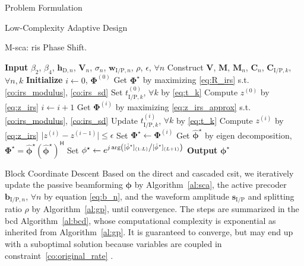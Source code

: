 \begin{section}{Problem Formulation}
\begin{subsection}{Low-Complexity Adaptive Design}
		\begin{algorithm}[!t]
			\caption{M-\gls{sca}: \gls{ris} Phase Shift.}
			\label{al:m_sca}
			\begin{algorithmic}[1]
				\State \textbf{Input} $\beta_2$, $\beta_4$, $\mathbf{h}_{\mathrm{D},n}$, $\mathbf{V}_{n}$, $\sigma_n$, $\mathbf{w}_{\mathrm{I/P},n}$, $\rho$, $\epsilon$, $\forall n$
				\State Construct $\mathbf{V}$, $\mathbf{M}$, $\mathbf{M}_n$, $\mathbf{C}_{n}$, $\mathbf{C}_{\mathrm{I/P},k}$, $\forall n,k$
				\State \textbf{Initialize} $i \gets 0$, $\mathbf{\Phi}^{(0)}$
					\State Get $\mathbf{\Phi}^{\star}$ by maximizing \eqref{eq:R_irs} s.t. \eqref{co:irs_modulus}, \eqref{co:irs_sd}
				\Else
					\State Set $t_{\mathrm{I/P},k}^{(0)}$, $\forall k$ by \eqref{eq:t_k}
					\State Compute $z^{(0)}$ by \eqref{eq:z_irs}
					\Repeat
						\State $i \gets i + 1$
							\State Get $\mathbf{\Phi}^{(i)}$ by maximizing \eqref{eq:z_irs_approx} s.t. \eqref{co:irs_modulus}, \eqref{co:irs_sd}
							\State Update $t_{\mathrm{I/P},k}^{(i)}$, $\forall k$ by \eqref{eq:t_k}
							\State Compute $z^{(i)}$ by \eqref{eq:z_irs}
					\Until $\lvert z^{(i)}-z^{(i-1)} \rvert \le \epsilon$
					\State Set $\mathbf{\Phi}^{\star} \gets \mathbf{\Phi}^{(i)}$
				\EndIf
				\State Get $\hat{\mathbf{\phi}}^\star$ by eigen decomposition, $\mathbf{\Phi}^{\star}=\hat{\mathbf{\phi}}^\star(\hat{\mathbf{\phi}}^\star)^\mathsf{H}$
				\State Set $\mathbf{\phi}^{\star} \gets e^{j \arg\left([\hat{\mathbf{\phi}}^\star]_{(1:L)} \middle/ [\hat{\mathbf{\phi}}^\star]_{(L+1)}\right)}$
				\State \textbf{Output} $\mathbf{\phi}^{\star}$
			\end{algorithmic}
		\end{algorithm}
	\end{subsection}


	\begin{subsection}{Block Coordinate Descent}
		Based on the direct and cascaded \gls{csit}, we iteratively update the passive beamforming $\mathbf{\phi}$ by Algorithm~\ref{al:sca}, the active precoder $\mathbf{b}_{\mathrm{I/P},n}$, $\forall n$ by equation \eqref{eq:b_n}, and the waveform amplitude $\mathbf{s}_{\mathrm{I/P}}$ and splitting ratio $\rho$ by Algorithm~\ref{al:gp}, until convergence. The steps are summarized in the \gls{bcd} Algorithm~\ref{al:bcd}, whose computational complexity is exponential as inherited from Algorithm~\ref{al:gp}. It is guaranteed to converge, but may end up with a suboptimal solution because variables are coupled in constraint~\eqref{co:original_rate} \cite{Grippo2000}.


\end{subsection}
\end{section}
